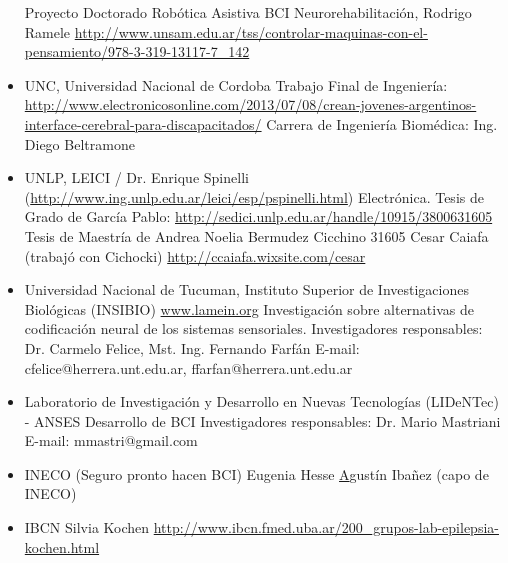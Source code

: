 \begin{itemize}
Proyecto Doctorado Robótica Asistiva BCI Neurorehabilitación, Rodrigo Ramele
\url{http://www.unsam.edu.ar/tss/controlar-maquinas-con-el-pensamiento/978-3-319-13117-7_142}
\item UNC, Universidad Nacional de Cordoba
Trabajo Final de Ingeniería: \url{http://www.electronicosonline.com/2013/07/08/crean-jovenes-argentinos-interface-cerebral-para-discapacitados/}
Carrera de Ingeniería Biomédica: Ing. Diego Beltramone
\item UNLP, LEICI / Dr. Enrique Spinelli (\url{http://www.ing.unlp.edu.ar/leici/esp/pspinelli.html})
Electrónica.
Tesis de Grado de García Pablo: \url{http://sedici.unlp.edu.ar/handle/10915/3800631605}
Tesis de Maestría de Andrea Noelia Bermudez Cicchino 31605
Cesar Caiafa (trabajó con Cichocki) \url{http://ccaiafa.wixsite.com/cesar}
\item Universidad Nacional de Tucuman, Instituto Superior de Investigaciones Biológicas (INSIBIO)
\url{www.lamein.org}
Investigación sobre alternativas de codificación neural de los sistemas sensoriales.
Investigadores responsables: Dr. Carmelo Felice, Mst. Ing. Fernando Farfán
E-mail: cfelice@herrera.unt.edu.ar, ffarfan@herrera.unt.edu.ar
\item Laboratorio de Investigación y Desarrollo en Nuevas Tecnologías (LIDeNTec) - ANSES
Desarrollo de BCI
Investigadores responsables: Dr. Mario Mastriani
E-mail: mmastri@gmail.com
\item INECO (Seguro pronto hacen BCI)
Eugenia Hesse \href{https://neuro.org.ar/sites/neuro.org.ar/files/Hesse-2015-Early%20detection%20of%20intentional%20harm.pdf}
Agustín Ibañez (capo de INECO)
\item  IBCN Silvia Kochen
\url{http://www.ibcn.fmed.uba.ar/200_grupos-lab-epilepsia-kochen.html}

\end{itemize}